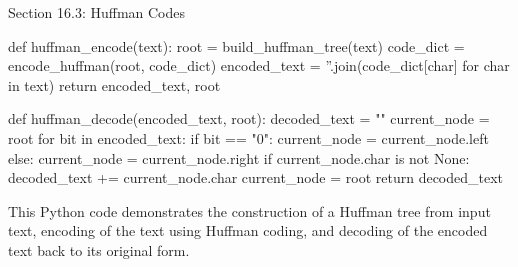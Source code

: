 \begin{notes}{Section 16.3: Huffman Codes}
\begin{highlight}
\begin{code}[Python]
    def huffman_encode(text):
        root = build_huffman_tree(text)
        code_dict = {}
        encode_huffman(root, code_dict)
        encoded_text = ''.join(code_dict[char] for char in text)
        return encoded_text, root
    
    def huffman_decode(encoded_text, root):
        decoded_text = ""
        current_node = root
        for bit in encoded_text:
            if bit == "0":
                current_node = current_node.left
            else:
                current_node = current_node.right
            if current_node.char is not None:
                decoded_text += current_node.char
                current_node = root
        return decoded_text
    \end{code}
    
    This Python code demonstrates the construction of a Huffman tree from input text, encoding of the text using Huffman coding, and decoding of the encoded text back to its original form.
    \end{highlight}    
\end{notes}